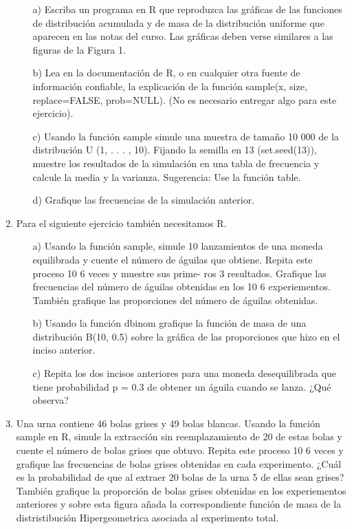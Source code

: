 \documentclass[11pt,letterpaper]{article}
\begin{document}
\begin{enumerate}
\begin{itemize}
\item[a)] Escriba un programa en \textsc{R}  que reproduzca las gráficas de las funciones de distribución
acumulada y de masa de la distribución uniforme que aparecen en las notas del curso. Las gráficas deben verse similares a las figuras de la Figura 1.

\item[b)] Lea en la documentación de \textsc{R}, o en cualquier otra fuente de información confiable,
la explicación de la función sample(x, size, replace=FALSE, prob=NULL). (No es necesario entregar algo para este ejercicio).

\item[c)] Usando la función sample simule una muestra de tamaño 10 000 de la distribución
U (1, . . . , 10). Fijando la semilla en 13 (set.seed(13)), muestre los resultados de la
simulación en una tabla de frecuencia y calcule la media y la varianza. Sugerencia: Use la función table.
\item[d)] Grafique las frecuencias de la simulación anterior.
\end{itemize}


\item Para el siguiente ejercicio también necesitamos R.


\begin{itemize}
\item[a)] Usando la función sample, simule 10 lanzamientos de una moneda equilibrada y cuente
el número de águilas que obtiene. Repita este proceso 10 6 veces y muestre sus prime-
ros 3 resultados. Grafique las frecuencias del número de águilas obtenidas en los 10 6
experiementos. También grafique las proporciones del número de águilas obtenidas.
\item[b)] Usando la función dbinom grafique la función de masa de una distribución B(10, 0.5)
sobre la gráfica de las proporciones que hizo en el inciso anterior.
\item[c)] Repita los dos incisos anteriores para una moneda desequilibrada que tiene probabilidad
p = 0.3 de obtener un águila cuando se lanza. ¿Qué observa?
\end{itemize}

\item Una urna contiene 46 bolas grises y 49 bolas blancas. Usando la función sample en R, simule
la extracción sin reemplazamiento de 20 de estas bolas y cuente el número de bolas grises que
obtuvo. Repita este proceso 10 6 veces y grafique las frecuencias de bolas grises obtenidas en
cada experimento. ¿Cuál es la probabilidad de que al extraer 20 bolas de la urna 5 de ellas
sean grises? También grafique la proporción de bolas grises obtenidas en los experiementos
anteriores y sobre esta figura añada la correspondiente función de masa de la distristibución
Hipergeometrica asociada al experimento total.


\end{enumerate}
\end{document}
